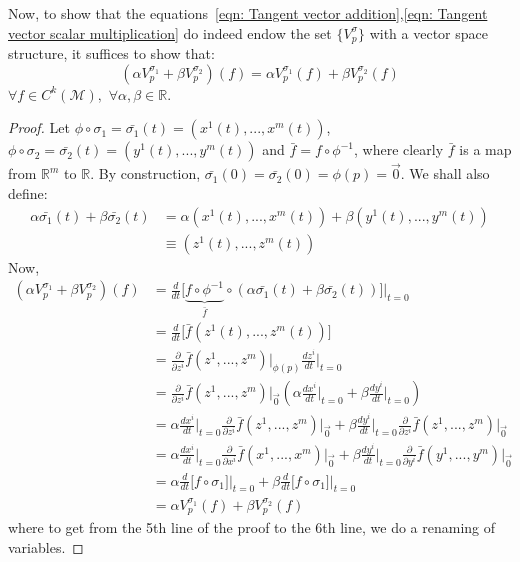      Now, to show that the equations~\ref{eqn: Tangent vector
      addition},\ref{eqn: Tangent vector scalar multiplication} do indeed
      endow the set $\{V_p^\sigma\}$ with a vector space structure, it suffices
      to show that:
      \begin{equation*}
        \left(\alpha V^{\sigma_1}_p+ \beta V^{\sigma_2}_p\right)(f)= \alpha
        V^{\sigma_1}_p(f) + \beta V^{\sigma_2}_p(f)
      \end{equation*}
      $\forall f\in C^k(\mathcal{M}),\,\,\forall \alpha,\beta \in \mathbb{R}$.
      \begin{proof}
        Let $\phi\circ\sigma_1 = \bar{\sigma_1}(t) =
        \left(x^1(t),...,x^m(t)\right)$, $\phi\circ\sigma_2 =
        \bar{\sigma_2}(t) = \left(y^1(t),...,y^m(t)\right)$ and $\bar{f} =
        f \circ \phi^{-1}$, where clearly $\bar{f}$ is a map from
        $\mathbb{R}^m$ to $\mathbb{R}$. By construction, $\bar{\sigma_1}(0)
        = \bar{\sigma_2}(0) = \phi(p) = \vec{0}$. We shall also define:
        \begin{align*}
          \alpha\bar{\sigma_1}(t) + \beta\bar{\sigma_2}(t) &= \alpha
          \left(x^1(t),...,x^m(t)\right) + \beta
          \left(y^1(t),...,y^m(t)\right) \\
          &\equiv (z^1(t),...,z^m(t))
        \end{align*}
        Now, 
        \begin{align*}
          \left(\alpha V^{\sigma_1}_p+ \beta V^{\sigma_2}_p\right)(f) 
          &= \frac{d}{dt}\big[\underbrace{f\circ\phi^{-1}}_{\bar{f}}\circ
          \left(\alpha\bar{\sigma_1}(t) +
          \beta\bar{\sigma_2}(t)\right)\big]\Bigr|_{t=0} \\
          &= \frac{d}{dt}\big[\bar{f}(z^1(t),...,z^m(t))\big] \\
          &= \frac{\partial}{\partial z^i}
          \bar{f}(z^1,...,z^m)\Bigr|_{\phi(p)} \frac{dz^i}{dt}\Bigr|_{t =
          0}\\
          &= \frac{\partial}{\partial z^i}
          \bar{f}(z^1,...,z^m)\Bigr|_{\vec{0}} \left(\alpha
          \frac{dx^i}{dt}\Bigr|_{t = 0} + \beta \frac{dy^i}{dt}\Bigr|_{t =
          0}\right) \\
          &= \alpha \frac{dx^i}{dt}\Bigr|_{t = 0}\frac{\partial}{\partial
          z^i} \bar{f}(z^1,...,z^m)\Bigr|_{\vec{0}} + \beta
          \frac{dy^i}{dt}\Bigr|_{t = 0}\frac{\partial}{\partial z^i}
          \bar{f}(z^1,...,z^m)\Bigr|_{\vec{0}} \\
          &= \alpha \frac{dx^i}{dt}\Bigr|_{t = 0}\frac{\partial}{\partial
          x^i} \bar{f}(x^1,...,x^m)\Bigr|_{\vec{0}} + \beta
          \frac{dy^i}{dt}\Bigr|_{t = 0}\frac{\partial}{\partial y^i}
          \bar{f}(y^1,...,y^m)\Bigr|_{\vec{0}} \\
          &= \alpha \frac{d}{dt}\big[f\circ\sigma_1\big]\Bigr|_{t=0} +
          \beta \frac{d}{dt}\big[f\circ\sigma_1\big]\Bigr|_{t=0} \\
          &= \alpha V^{\sigma_1}_p(f) + \beta V^{\sigma_2}_p(f)
        \end{align*}
        where to get from the 5th line of the proof to the 6th line, we do
        a renaming of variables.
      \end{proof}
